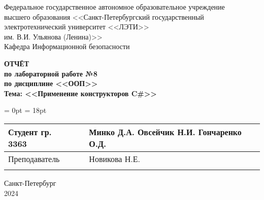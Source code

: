  \thispagestyle{empty}

\begin{center}
	Федеральное государственное автономное образовательное учреждение \\
	высшего образования <<Санкт-Петербургский государственный \\ 
	электротехнический университет <<ЛЭТИ>> \\
	им. В.И. Ульянова (Ленина)>>\\
	Кафедра Информационной безопасности\\
\end{center}

\vfill

\begin{center}
	
	{\bfseries ОТЧЁТ \\
	по лабораторной работе №8 \\
	по дисциплине <<ООП>>\\
	Тема: <<Применение конструкторов C\#>>}
\end{center}

\vfill

\begin{table}[H]
	\tabcolsep = 0pt
	\extrarowheight = 18pt
	\begin{tabularx}{\textwidth}{>{\raggedright\arraybackslash}b{6.3cm}>{\raggedright\arraybackslash}b{4.6cm}>{\centering\arraybackslash}X}
		Студент гр. 3363&&Минко Д.А. Овсейчик Н.И. Гончаренко О.Д.\\ \cline{2-2}
		Преподаватель&&Новикова Н.Е.\\ \cline{2-2}
	\end{tabularx}
\end{table}

\begin{center}
	Санкт-Петербург \\ 2024
\end{center}
